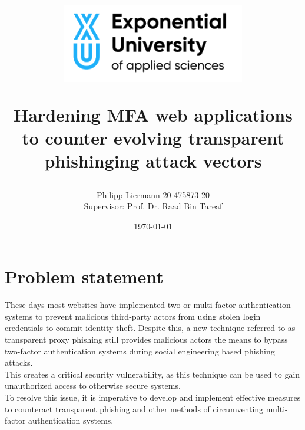 \documentclass[12pt]{report}
\begin{document}
\author{Philipp Liermann 20-475873-20\\Supervisor: Prof. Dr. Raad Bin Tareaf}
\date{\today}

\title{
\begin{center}
	\includegraphics[width=8cm]{./images/logo.png}
\end{center}
\vspace{2cm}
Hardening MFA web applications to counter evolving transparent phishinging attack
vectors
\vspace{2cm}
\large }

\maketitle

\newpage
\tableofcontents

\newpage
\section{Problem statement}
These days most websites have implemented two or multi-factor authentication systems
to prevent malicious third-party actors from using stolen login credentials to
commit identity theft. Despite this, a new technique referred to as transparent
proxy phishing still provides malicious actors the means to bypass two-factor authentication
systems during social engineering based phishing attacks.\\This creates a
critical security vulnerability, as this technique can be used to gain unauthorized
access to otherwise secure systems.\\To resolve this issue, it is imperative to
develop and implement effective measures to counteract transparent phishing and
other methods of circumventing multi-factor authentication systems.
\end{document}
